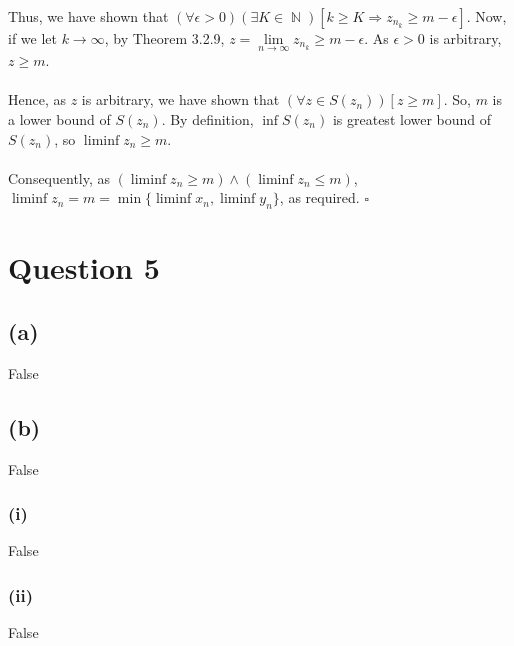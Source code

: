 \documentclass[a4paper,11pt]{article}
\renewenvironment{proof}{{\bfseries Proof.}}{\hfill $\square$}
\DeclareMathOperator{\N}{\mathbb{N}}
\begin{document}
\begin{proof}
Thus, we have shown that $(\forall \epsilon > 0)(\exists K \in \N)[k \geq K \Rightarrow z_{n_k} \geq m-\epsilon]$. Now, if we let $k \to \infty$, by Theorem 3.2.9, $z = \lim\limits_{n \to \infty}{z_{n_k}} \geq m - \epsilon$. As $\epsilon > 0$ is arbitrary, $z \geq m$. \\\\
Hence, as $z$ is arbitrary, we have shown that $(\forall z \in S(z_n))[z \geq m]$. So, $m$ is a lower bound of $S(z_n)$. By definition, $\inf{S(z_n)}$ is greatest lower bound of $S(z_n)$, so $\liminf z_n \geq m$. \\\\
Consequently, as $(\liminf z_n \geq m) \land (\liminf z_n \leq m)$, $\liminf z_n = m = \min\{\liminf x_n,\liminf y_n\}$, as required.
\end{proof}

\section{Question 5}
\subsection{(a)}
False
\subsection{(b)}
False
\subsubsection{(i)}
False
\subsubsection{(ii)}
False
\end{document}
